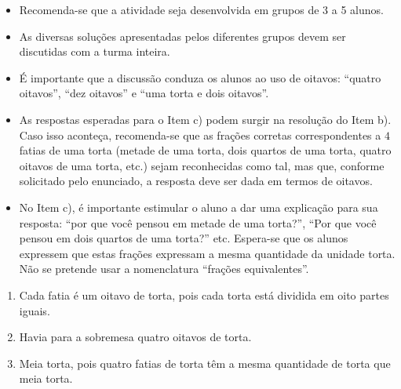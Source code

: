 \begin{multicols}{2}
\begin{orientacoes}

\begin{itemize} %
    \item Recomenda-se que a atividade seja desenvolvida em grupos de 3 a 5 alunos.
    \item As diversas soluções apresentadas pelos diferentes grupos devem ser discutidas com a turma inteira.
    \item É importante que a discussão conduza os alunos ao uso de oitavos:  ``quatro oitavos'', ``dez oitavos'' e ``uma torta e dois oitavos''.
     \item As respostas esperadas para o Item c) podem surgir na resolução do Item b). Caso isso aconteça, recomenda-se que as frações corretas correspondentes a $4$ fatias de uma torta (metade de uma torta, dois quartos de uma torta, quatro oitavos de uma torta, etc.) sejam reconhecidas como tal, mas que, conforme solicitado pelo enunciado, a resposta deve ser dada em termos de oitavos.
     \item No Item c), é importante estimular o aluno a dar uma explicação para sua resposta: ``por que você pensou em metade de uma torta?'', ``Por que você pensou em dois quartos de uma torta?'' etc. Espera-se que os alunos expressem que estas frações expressam a mesma quantidade da unidade torta. Não se pretende usar a nomenclatura ``frações equivalentes''.
\end{itemize}




\end{orientacoes}

\begin{solucao}{}{}
\begin{enumerate} [\quad a)] %
    \item       Cada fatia é um oitavo de torta, pois cada torta está dividida em oito partes iguais.
    \item       Havia para a sobremesa quatro oitavos de torta.
    \item       Meia torta, pois quatro fatias de torta têm a mesma quantidade de torta que meia torta.


\end{enumerate}
\end{solucao}
\end{multicols}
